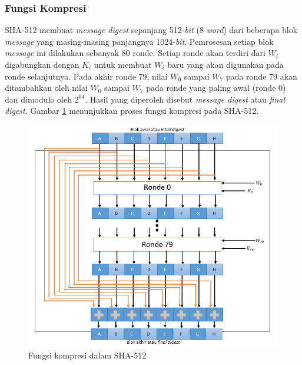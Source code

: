 \subsubsection{Fungsi Kompresi}
SHA-512 membuat \textit{message digest} sepanjang 512-\textit{bit} (8 \textit{word}) dari beberapa blok \textit{message} yang masing-masing panjangnya 1024-\textit{bit}. Pemrosesan setiap blok \textit{message} ini dilakukan sebanyak 80 ronde. Setiap ronde akan terdiri dari \begin{math}W_i\end{math} digabungkan dengan \begin{math}K_i\end{math} untuk membuat \begin{math}W_i\end{math} baru yang akan digunakan pada ronde selanjutnya. Pada akhir ronde 79, nilai \begin{math}W_0\end{math} sampai \begin{math}W_7\end{math} pada ronde 79 akan ditambahkan oleh nilai \begin{math}W_0\end{math} sampai \begin{math}W_7\end{math} pada ronde yang paling awal (ronde 0) dan dimodulo oleh \begin{math}2^{64}\end{math}. Hasil yang diperoleh disebut \textit{message digest} atau \textit{final digest}. Gambar \ref{fig:fungsikompresi} menunjukkan proses fungsi kompresi pada SHA-512.

\begin{figure}[H]
	\includegraphics[scale=0.8]{Gambar/compression_function}
	\centering
	\caption{Fungsi kompresi dalam SHA-512}\label{fig:fungsikompresi}
\end{figure}

